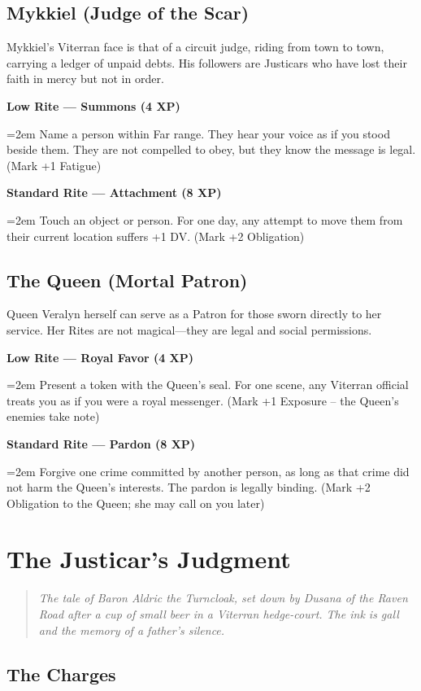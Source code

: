 \documentclass[11pt,twoside]{book}
\newenvironment{quotebox}
{\begin{quote}\small\itshape}
{\end{quote}}
\newcommand{\legalitem}[1]{\par\noindent\textbf{#1}\par\noindent\hangindent=2em\hangafter=1}
\begin{document}
\section{Mykkiel (Judge of the Scar)}

Mykkiel's Viterran face is that of a circuit judge, riding from town to town, carrying a ledger of unpaid debts. His followers are Justicars who have lost their faith in mercy but not in order.

\legalitem{Low Rite --- Summons (4 XP)} Name a person within Far range. They hear your voice as if you stood beside them. They are not compelled to obey, but they know the message is legal. (Mark +1 Fatigue)

\legalitem{Standard Rite --- Attachment (8 XP)} Touch an object or person. For one day, any attempt to move them from their current location suffers +1 DV. (Mark +2 Obligation)

\section{The Queen (Mortal Patron)}

Queen Veralyn herself can serve as a Patron for those sworn directly to her service. Her Rites are not magical---they are legal and social permissions.

\legalitem{Low Rite --- Royal Favor (4 XP)} Present a token with the Queen's seal. For one scene, any Viterran official treats you as if you were a royal messenger. (Mark +1 Exposure -- the Queen's enemies take note)

\legalitem{Standard Rite --- Pardon (8 XP)} Forgive one crime committed by another person, as long as that crime did not harm the Queen's interests. The pardon is legally binding. (Mark +2 Obligation to the Queen; she may call on you later)

\chapter{The Justicar's Judgment}

\begin{quotebox}
\textit{The tale of Baron Aldric the Turncloak, set down by Dusana of the Raven Road after a cup of small beer in a Viterran hedge-court. The ink is gall and the memory of a father's silence.}
\end{quotebox}

\section{The Charges}
\end{document}
